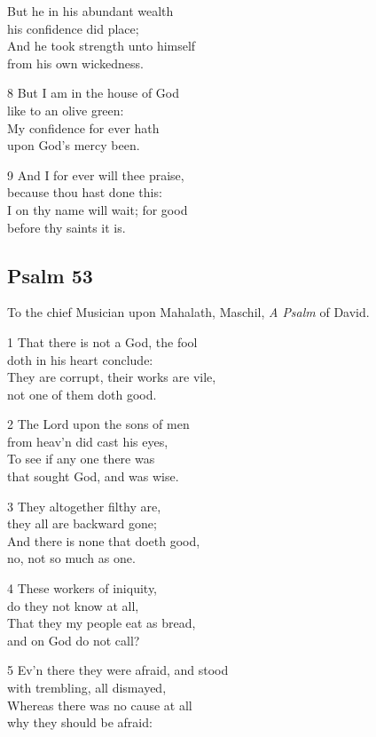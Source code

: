 \begin{multicols}{3}
But he in his abundant wealth\\
his confidence did place;\\
And he took strength unto himself\\
from his own wickedness.

8 But I am in the house of God\\
like to an olive green:\\
My confidence for ever hath\\
upon God’s mercy been.

9 And I for ever will thee praise,\\
because thou hast done this:\\
I on thy name will wait; for good\\
before thy saints it is.

\begin{center}
\quad{}\quad{}
\end{center}

\subsection*{Psalm 53}

To the chief Musician upon Mahalath, Maschil,
\emph{A Psalm} of David.

1 That there is not a God, the fool\\
doth in his heart conclude:\\
They are corrupt, their works are vile,\\
not one of them doth good.

2 The Lord upon the sons of men\\
from heav’n did cast his eyes,\\
To see if any one there was\\
that sought God, and was wise.

3 They altogether filthy are,\\
they all are backward gone;\\
And there is none that doeth good,\\
no, not so much as one.

4 These workers of iniquity,\\
do they not know at all,\\
That they my people eat as bread,\\
and on God do not call?

5 Ev’n there they were afraid, and stood\\
with trembling, all dismayed,\\
Whereas there was no cause at all\\
why they should be afraid:


\end{multicols}
